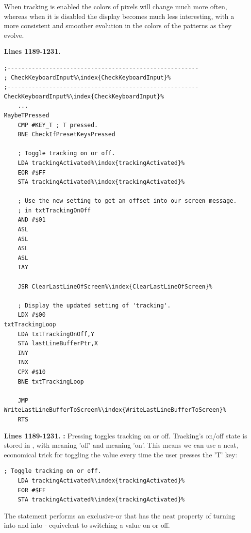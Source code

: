 When tracking is enabled the colors of pixels will change much more often, whereas when it is disabled
the display becomes much less interesting, with a more consistent and smoother evolution in the colors
of the patterns as they evolve.

\clearpage
\textbf{Lines 1189-1231. } 
\begin{lstlisting}[escapechar=\%]
;-------------------------------------------------------
; CheckKeyboardInput%\index{CheckKeyboardInput}%
;-------------------------------------------------------
CheckKeyboardInput%\index{CheckKeyboardInput}%   
    ...
MaybeTPressed   
    CMP #KEY_T ; T pressed.
    BNE CheckIfPresetKeysPressed

    ; Toggle tracking on or off.
    LDA trackingActivated%\index{trackingActivated}%
    EOR #$FF
    STA trackingActivated%\index{trackingActivated}%

    ; Use the new setting to get an offset into our screen message.
    ; in txtTrackingOnOff
    AND #$01
    ASL 
    ASL 
    ASL 
    ASL 
    TAY 

    JSR ClearLastLineOfScreen%\index{ClearLastLineOfScreen}%

    ; Display the updated setting of 'tracking'.
    LDX #$00
txtTrackingLoop   
    LDA txtTrackingOnOff,Y
    STA lastLineBufferPtr,X
    INY 
    INX 
    CPX #$10
    BNE txtTrackingLoop

    JMP WriteLastLineBufferToScreen%\index{WriteLastLineBufferToScreen}%
    RTS 
\end{lstlisting}
\clearpage

\textbf{Lines 1189-1231. :} 
Pressing  toggles tracking on or off. Tracking's on/off state is 
stored in , with  meaning 'off' and
 meaning 'on'. This means we can use a neat, economical trick
for toggling the value every time the user presses the 'T' key:

\begin{lstlisting}[escapechar=\%]
    ; Toggle tracking on or off.
    LDA trackingActivated%\index{trackingActivated}%
    EOR #$FF
    STA trackingActivated%\index{trackingActivated}%
\end{lstlisting}

The  statement performs an exclusive-or that has the neat property of
turning  into  and  into  - equivelent
to switching a value on or off.

